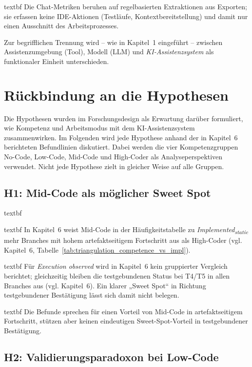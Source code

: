 	\csname textbf Die Chat-Metriken beruhen auf regelbasierten Extraktionen aus Exporten; sie erfassen keine IDE-Aktionen (Testläufe, Kontextbereitstellung) und damit nur einen Ausschnitt des Arbeitsprozesses.

Zur begrifflichen Trennung wird -- wie in Kapitel~1 eingeführt -- zwischen Assistenzumgebung (Tool), Modell (LLM) und \emph{KI-Assistenzsystem} als funktionaler Einheit unterschieden.

\section{Rückbindung an die Hypothesen}
\label{sec:discussion_hypotheses}

Die Hypothesen wurden im Forschungsdesign als Erwartung darüber formuliert, wie Kompetenz und Arbeitsmodus mit dem KI-Assistenzsystem zusammenwirken.
Im Folgenden wird jede Hypothese anhand der in Kapitel~6 berichteten Befundlinien diskutiert.
Dabei werden die vier Kompetenzgruppen No-Code, Low-Code, Mid-Code und High-Coder als Analyseperspektiven verwendet.
Nicht jede Hypothese zielt in gleicher Weise auf alle Gruppen.

\subsection{H1: Mid-Code als möglicher Sweet Spot}
\label{sec:discussion_h1}

	\csname textbf

	\csname textbf In Kapitel~6 weist Mid-Code in der Häufigkeitstabelle zu \textit{Implemented\textsubscript{static}} mehr Branches mit hohem artefaktseitigem Fortschritt aus als High-Coder (vgl. Kapitel~6, Tabelle~\ref{tab:triangulation_competence_vs_impl}).

	\csname textbf Für \textit{Execution observed} wird in Kapitel~6 kein gruppierter Vergleich berichtet; gleichzeitig bleiben die testgebundenen Status bei T4/T5 in allen Branches aus (vgl. Kapitel~6). Ein klarer „Sweet Spot“ in Richtung testgebundener Bestätigung lässt sich damit nicht belegen.

	\csname textbf Die Befunde sprechen für einen Vorteil von Mid-Code in artefaktseitigem Fortschritt, stützen aber keinen eindeutigen Sweet-Spot-Vorteil in testgebundener Bestätigung.

\subsection{H2: Validierungsparadoxon bei Low-Code}
\label{sec:discussion_h2}

